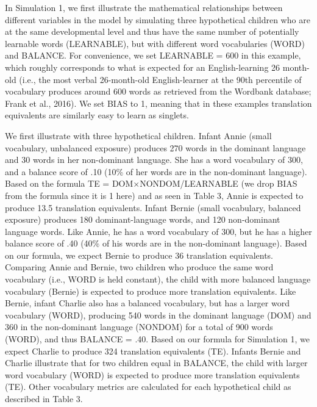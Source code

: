 \documentclass[
  english,
  ,man,floatsintext]{apa6}
\begin{document}
In Simulation 1, we first illustrate the mathematical relationships between different variables in the model by simulating three hypothetical children who are at the same developmental level and thus have the same number of potentially learnable words (LEARNABLE), but with different word vocabularies (WORD) and BALANCE. For convenience, we set LEARNABLE = 600 in this example, which roughly corresponds to what is expected for an English-learning 26 month-old (i.e., the most verbal 26-month-old English-learner at the 90th percentile of vocabulary produces around 600 words as retrieved from the Wordbank database; Frank et al., 2016). We set BIAS to 1, meaning that in these examples translation equivalents are similarly easy to learn as singlets.

We first illustrate with three hypothetical children. Infant Annie (small vocabulary, unbalanced exposure) produces 270 words in the dominant language and 30 words in her non-dominant language. She has a word vocabulary of 300, and a balance score of .10 (10\% of her words are in the non-dominant language). Based on the formula TE = DOM×NONDOM/LEARNABLE (we drop BIAS from the formula since it is 1 here) and as seen in Table 3, Annie is expected to produce 13.5 translation equivalents. Infant Bernie (small vocabulary, balanced exposure) produces 180 dominant-language words, and 120 non-dominant language words. Like Annie, he has a word vocabulary of 300, but he has a higher balance score of .40 (40\% of his words are in the non-dominant language). Based on our formula, we expect Bernie to produce 36 translation equivalents. Comparing Annie and Bernie, two children who produce the same word vocabulary (i.e., WORD is held constant), the child with more balanced language vocabulary (Bernie) is expected to produce more translation equivalents. Like Bernie, infant Charlie also has a balanced vocabulary, but has a larger word vocabulary (WORD), producing 540 words in the dominant language (DOM) and 360 in the non-dominant language (NONDOM) for a total of 900 words (WORD), and thus BALANCE = .40. Based on our formula for Simulation 1, we expect Charlie to produce 324 translation equivalents (TE). Infants Bernie and Charlie illustrate that for two children equal in BALANCE, the child with larger word vocabulary (WORD) is expected to produce more translation equivalents (TE). Other vocabulary metrics are calculated for each hypothetical child as described in Table 3.
\end{document}

